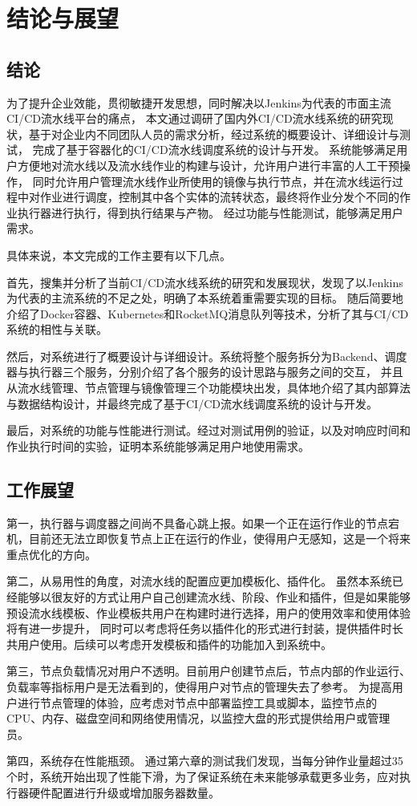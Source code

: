 
\chapter{结论与展望}

\section{结论}

为了提升企业效能，贯彻敏捷开发思想，同时解决以Jenkins为代表的市面主流CI/CD流水线平台的痛点，
本文通过调研了国内外CI/CD流水线系统的研究现状，基于对企业内不同团队人员的需求分析，经过系统的概要设计、详细设计与测试，
完成了基于容器化的CI/CD流水线调度系统的设计与开发。
系统能够满足用户方便地对流水线以及流水线作业的构建与设计，允许用户进行丰富的人工干预操作，
同时允许用户管理流水线作业所使用的镜像与执行节点，并在流水线运行过程中对作业进行调度，控制其中各个实体的流转状态，最终将作业分发个不同的作业执行器进行执行，得到执行结果与产物。
经过功能与性能测试，能够满足用户需求。

具体来说，本文完成的工作主要有以下几点。

首先，搜集并分析了当前CI/CD流水线系统的研究和发展现状，发现了以Jenkins为代表的主流系统的不足之处，明确了本系统着重需要实现的目标。
随后简要地介绍了Docker容器、Kubernetes和RocketMQ消息队列等技术，分析了其与CI/CD系统的相性与关联。

然后，对系统进行了概要设计与详细设计。系统将整个服务拆分为Backend、调度器与执行器三个服务，分别介绍了各个服务的设计思路与服务之间的交互，
并且从流水线管理、节点管理与镜像管理三个功能模块出发，具体地介绍了其内部算法与数据结构设计，并最终完成了基于CI/CD流水线调度系统的设计与开发。

最后，对系统的功能与性能进行测试。经过对测试用例的验证，以及对响应时间和作业执行时间的实验，证明本系统能够满足用户地使用需求。

\section{工作展望}

第一，执行器与调度器之间尚不具备心跳上报。如果一个正在运行作业的节点宕机，目前还无法立即恢复节点上正在运行的作业，使得用户无感知，这是一个将来重点优化的方向。

第二，从易用性的角度，对流水线的配置应更加模板化、插件化。
虽然本系统已经能够以很友好的方式让用户自己创建流水线、阶段、作业和插件，但是如果能够预设流水线模板、作业模板共用户在构建时进行选择，用户的使用效率和使用体验将有进一步提升，
同时可以考虑将任务以插件化的形式进行封装，提供插件时长共用户使用。后续可以考虑开发模板和插件的功能加入到系统中。

第三，节点负载情况对用户不透明。目前用户创建节点后，节点内部的作业运行、负载率等指标用户是无法看到的，使得用户对节点的管理失去了参考。
为提高用户进行节点管理的体验，应考虑对节点中部署监控工具或脚本，监控节点的CPU、内存、磁盘空间和网络使用情况，以监控大盘的形式提供给用户或管理员。

第四，系统存在性能瓶颈。
通过第六章的测试我们发现，当每分钟作业量超过35个时，系统开始出现了性能下滑，为了保证系统在未来能够承载更多业务，应对执行器硬件配置进行升级或增加服务器数量。